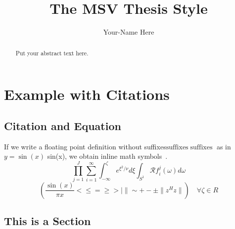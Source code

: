 \documentclass[twoside]{msvreport}%
\begin{document}
%
%
%
\title{The MSV Thesis Style}
\author{Your-Name Here}



%
\frontmatter
\maketitle
%
%
\begin{abstract}
Put your abstract text here.
\end{abstract}
%
%
\tableofcontents
%
%
%
\mainmatter
\chapter{Example with Citations}
\blindtext

\section{Citation and Equation}
If we write a floating point definition without suffixes$\mathrm{suffixes}\operatorname{suffixes}$ as in $y = \sin(x)$ sin(x), we obtain inline math symbols~\cite{Aldroubi01,Bazaraa06,WeStSh06}.
\begin{equation}
\prod_{j=1}^J\sum_{i=1}^\infty \int_{-\infty}^\zeta e^{\xi^2/\nu}d\xi \int_{S^1} \mathcal{R}f_i^j(\omega) d\omega
\end{equation}
\begin{equation}
\left(\frac{\sin(x)}{\pi x} <\leq=\geq>|\|\sim+-\pm \| z^Hz\|\right)\quad \forall \zeta \in R
\end{equation}%

\blindtext[8]

\section{This is a Section}
\blindtext[1]
\end{document}
